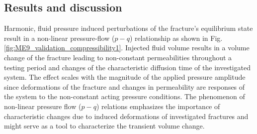 \subsection{Results and discussion}
Harmonic, fluid pressure induced perturbations of the fracture's equilibrium state result in a non-linear pressure-flow ($p-q$) relationship as shown in Fig. \ref{fig:ME9_validation_compressibility1}. Injected fluid volume results in a volume change of the fracture leading to non-constant permeabilities throughout a testing period and changes of the characteristic diffusion time of the investigated system. The effect scales with the magnitude of the applied pressure amplitude since deformations of the fracture and changes in permeability are responses of the system to the non-constant acting pressure conditions. The phenomenon of non-linear pressure flow ($p-q$) relations emphasizes the importance of characteristic changes due to induced deformations of investigated fractures and might serve as a tool to characterize the transient volume change.

